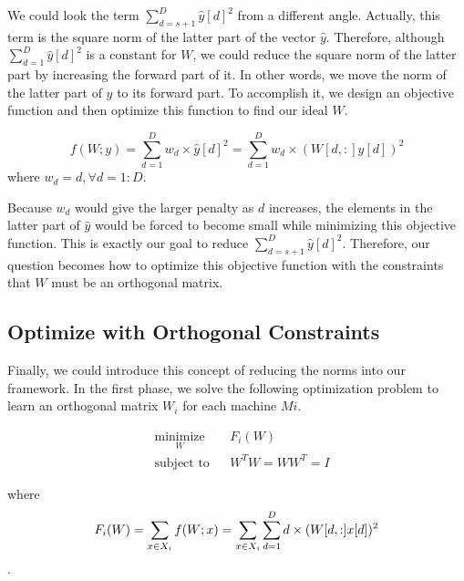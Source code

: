 We could look the term $\sum^D_{d=s+1}{\hat{y}[d]^2}$ from a different angle.  Actually, this term is the square norm of the latter part of the vector $\hat{y}$. Therefore, although $\sum^D_{d=1}{\hat{y}[d]^2}$ is a constant for $W$, we could reduce the square norm of the latter part by increasing the forward part of it.  In other words, we move the norm of the latter part of $y$ to its forward part.  To accomplish it, we design an objective function and then optimize this function to find our ideal $W$.

\begin{equation}\label{objective}
	f(W;y)=\sum^D_{d=1}{w_d\times\hat{y}[d]^2}=\sum^D_{d=1}{w_d\times(W[d,:]y[d])^2}
\end{equation}
where $w_d=d,  \forall d=1:D$.

Because $w_d$ would give the larger penalty as $d$ increases, the elements in the latter part of $\hat{y}$ would be forced to become small while minimizing this objective function.  This is exactly our goal to reduce $\sum^D_{d=s+1}{\hat{y}[d]^2}$.  Therefore, our question becomes how to optimize this objective function with the constraints that $W$ must be an orthogonal matrix.



\subsection{Optimize with Orthogonal Constraints} %
\label{ss:optimize_with_orthogonal_constraints}

Finally, we could introduce this concept of reducing the norms into our framework.  In the first phase, we solve the following optimization problem to learn an orthogonal matrix $W_i$ for each machine $Mi$.

\begin{equation}
\begin{aligned}
& \underset{W}{\text{minimize}}
& & F_i(W) \\
& \text{subject to}
& & W^{T}W=WW^{T}=I
\end{aligned}
\end{equation}

where 
\begin{equation}\label{objective-F}
	F_i(W)=\sum_{x \in X_i}{f(W;x)}\\
	=\sum_{x \in X_i}{ \sum^D_{d=1} {d\times(W[d,:]x[d])^2} }
\end{equation}.

